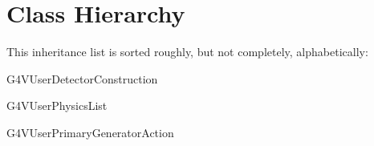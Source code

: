 \section{Class Hierarchy}
This inheritance list is sorted roughly, but not completely, alphabetically\-:\begin{DoxyCompactList}
\item G4\-V\-User\-Detector\-Construction\begin{DoxyCompactList}
\item {}
\end{DoxyCompactList}
\item G4\-V\-User\-Physics\-List\begin{DoxyCompactList}
\item {}
\item {}
\end{DoxyCompactList}
\item G4\-V\-User\-Primary\-Generator\-Action\begin{DoxyCompactList}
\item {}
\end{DoxyCompactList}
\item {}
\end{DoxyCompactList}
